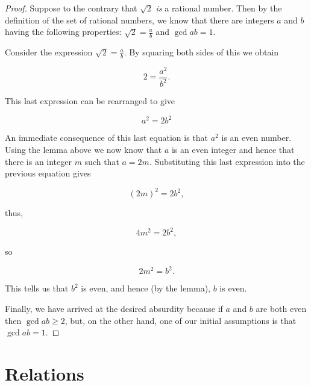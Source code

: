 \begin{proof}
Suppose to the contrary that $\sqrt{2}$ {\em is} a rational number.
Then by the definition of the set of rational numbers, we know that
there are integers 
$a$ and $b$ having the following properties: 
$\displaystyle \sqrt{2} = \frac{a}{b}$ and $\gcd{a}{b} = 1$.  

Consider the expression $\displaystyle \sqrt{2} = \frac{a}{b}$.   
By squaring both sides of this we obtain

\[ 2 = \frac{a^2}{b^2}. \]

This last expression can be rearranged to give

\begin{equation*}
a^2 = 2 b^2
\end{equation*}

An immediate consequence of this last equation is that $a^2$ is an
even number.  Using the lemma above we now know that $a$ is an even
integer and hence that there is an integer $m$ such that $a=2m$.
Substituting this last expression into the previous equation gives

\begin{equation*}
(2m)^2 = 2 b^2,
\end{equation*}

thus,

\begin{equation*}
4m^2 = 2 b^2,
\end{equation*}

so

\begin{equation*}
2m^2 = b^2.
\end{equation*}

This tells us that $b^2$ is even, and hence (by the lemma), $b$ is even.

Finally, we have arrived at the desired absurdity because if $a$ and
$b$ are both even then $\gcd{a}{b} \geq 2$, but, on the other hand,
one of our initial assumptions is that $\gcd{a}{b} = 1$. 

\end{proof}

\newpage




\newpage

\section{Relations}
\label{sec:rel_intro}

